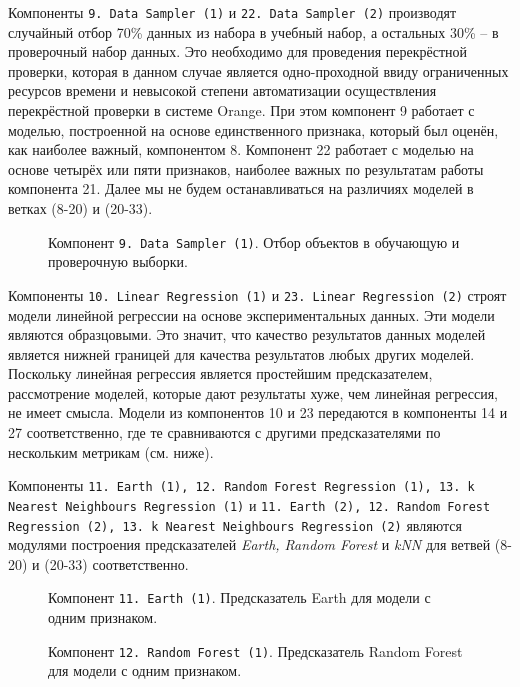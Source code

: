 Компоненты \texttt{9. Data Sampler (1)} и \texttt{22. Data Sampler (2)} производят случайный отбор 70\% данных из набора в учебный набор, а остальных 30\% -- в проверочный набор данных. Это необходимо для проведения перекрёстной проверки, которая в данном случае является одно-проходной ввиду ограниченных ресурсов времени и невысокой степени автоматизации осуществления перекрёстной проверки в системе Orange. При этом компонент 9 работает с моделью, построенной на основе единственного признака, который был оценён, как наиболее важный, компонентом 8. Компонент 22 работает с моделью на основе четырёх или пяти признаков, наиболее важных по результатам работы компонента 21. Далее мы не будем останавливаться на различиях моделей в ветках (8-20) и (20-33).

\begin{figure}[H]
    \caption{Компонент \texttt{9. Data Sampler (1)}. Отбор объектов в обучающую и проверочную выборки.}
    \label{img:9-Data-Sampler-1}
\end{figure}

Компоненты \texttt{10. Linear Regression (1)} и \texttt{23. Linear Regression (2)} строят модели линейной регрессии на основе экспериментальных данных. Эти модели являются образцовыми. Это значит, что качество результатов данных моделей является нижней границей для качества результатов любых других моделей. Поскольку линейная регрессия является простейшим предсказателем, рассмотрение моделей, которые дают результаты хуже, чем линейная регрессия, не имеет смысла. Модели из компонентов 10 и 23 передаются в компоненты 14 и 27 соответственно, где те сравниваются с другими предсказателями по нескольким метрикам (см. ниже).

Компоненты \texttt{11. Earth (1), 12. Random Forest Regression (1), 13. k Nearest Neighbours Regression (1)} и \texttt{11. Earth (2), 12. Random Forest Regression (2), 13. k Nearest Neighbours Regression (2)} являются модулями построения предсказателей \textit{Earth, Random Forest} и \textit{kNN} для ветвей (8-20) и (20-33) соответственно.

\begin{figure}[H]
    \caption{Компонент \texttt{11. Earth (1)}. Предсказатель Earth для модели с одним признаком.}
    \label{img:11-Earth-1}
\end{figure}

\begin{figure}[H]
    \center{\texttt{[image: 12-RF-1]}}
    \caption{Компонент \texttt{12. Random Forest (1)}. Предсказатель Random Forest для модели с одним признаком.}
    \label{img:12-RF-1}
\end{figure}


